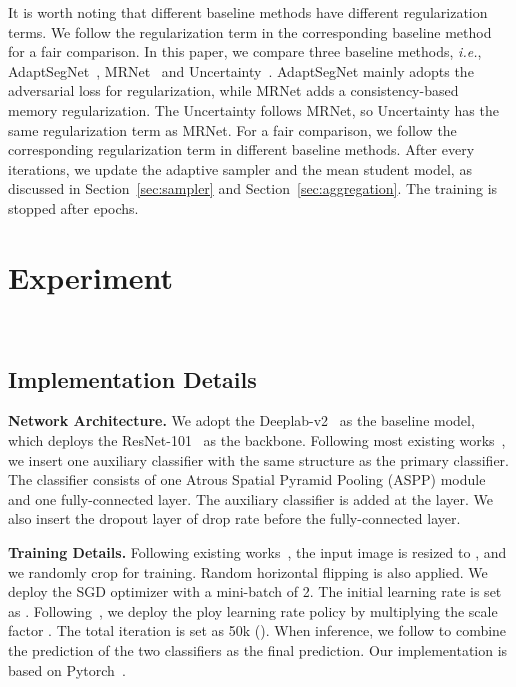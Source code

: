 \documentclass[journal]{IEEEtran}
\def\ie{\emph{i.e.}}
\begin{document}
It is worth noting that different baseline methods have different regularization terms. We follow the regularization term in the corresponding baseline method for a fair comparison. In this paper, we compare three baseline methods, \ie, AdaptSegNet~\cite{tsai2018learning}, MRNet~\cite{zheng2019unsupervised} and Uncertainty~\cite{zheng2020unsupervised}.   AdaptSegNet mainly adopts the adversarial loss for regularization, while MRNet adds a consistency-based  memory regularization. The Uncertainty follows MRNet, so Uncertainty has the same regularization term as MRNet. For a fair comparison, we follow the corresponding regularization term in different baseline methods. After every  iterations, we update the adaptive sampler and the mean student model, as discussed in Section~\ref{sec:sampler} and Section~\ref{sec:aggregation}. The training is stopped after  epochs.

\section{Experiment}~\label{sec:experiment}
\subsection{Implementation Details}
\noindent\textbf{Network Architecture.} We adopt the Deeplab-v2~\cite{chen2017deeplab} as the baseline model, which deploys the ResNet-101~\cite{he2016deep} as the backbone. Following most existing works~\cite{tsai2018learning,tsai2019domain,luo2019significance,luo2019taking,zheng2019unsupervised,zheng2020unsupervised}, we insert one auxiliary classifier with the same structure as the primary classifier. The classifier consists of one Atrous Spatial Pyramid Pooling (ASPP) module~\cite{chen2017deeplab} and one fully-connected layer. The auxiliary classifier is added at the  layer. We also insert the dropout layer of  drop rate before the fully-connected layer. 

\noindent\textbf{Training Details.}
Following existing works~\cite{tsai2018learning, luo2019significance}, the input image is resized to , and we randomly crop  for training. Random horizontal flipping is also applied. We deploy the SGD optimizer with a mini-batch of 2. The initial learning rate is set as . Following~\cite{zhao2017pyramid,zhang2019dual,zhang2020dynamic}, we deploy the ploy learning rate policy by multiplying the scale factor . The total iteration is set as 50k (). 
When inference, we follow \cite{zheng2019unsupervised,zheng2020unsupervised} to combine the prediction of the two classifiers as the final prediction. Our implementation is based on Pytorch~\cite{paszke2017automatic}.
\end{document}
